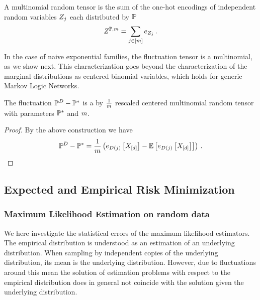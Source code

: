 \begin{definition}\label{def:mulinomialVariable}
	A multinomial random tensor is the sum of the one-hot encodings of independent random variables $Z_j$ each distributed by $\mathbb{P}$
		\[ Z^{\mathbb{P}, m} = \sum_{j\in[m]} e_{Z_j} \, . \] 
\end{definition}

In the case of naive exponential families, the fluctuation tensor is a multinomial, as we show next.
This characterization goes beyond the characterization of the marginal distributions as centered binomial variables, which holds for generic Markov Logic Networks.

\begin{lemma}\label{lem:multinomialEmpdistFluctuation}
	The fluctuation $\mathbb{P}^{D} - \mathbb{P}^*$ is a by $\frac{1}{m}$ rescaled centered multinomial random tensor with parameters $\mathbb{P}^*$ and $m$. %
\end{lemma}
\begin{proof}
	By the above construction we have
		\[  \mathbb{P}^{D} - \mathbb{P}^* 
		= \frac{1}{m} \left( e_{D(j)}\left[X_{[d]}\right] - \mathbb{E}\left[e_{D(j)}\left[X_{[d]}\right]\right] \right) \, .  \]
\end{proof}





\subsection{Expected and Empirical Risk Minimization}


\subsubsection{Maximum Likelihood Estimation on random data}

We here investigate the statistical errors of the maximum likelihood estimators.
The empirical distribution is understood as an estimation of an underlying distribution.
When sampling by independent copies of the underlying distribution, its mean is the underlying distribution.
However, due to fluctuations around this mean the solution of estimation problems with respect to the empirical distribution does in general not coincide with the solution given the underlying distribution.

